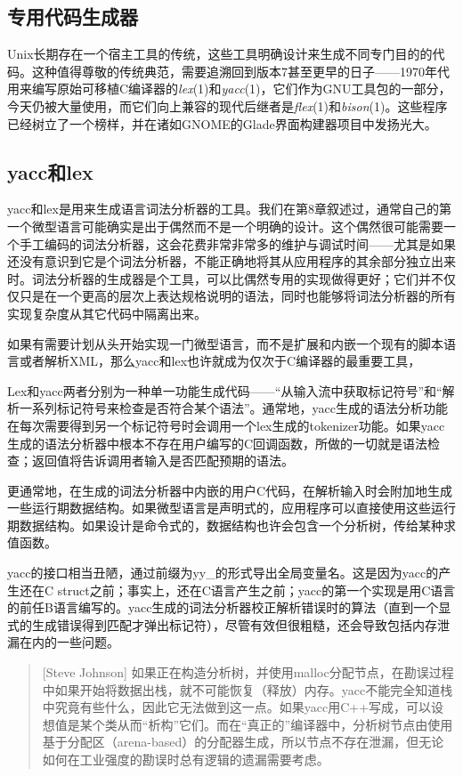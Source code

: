 \documentclass[12pt,oneside]{book}
\begin{document}
\begin{common-format}
\section{专用代码生成器}
Unix长期存在一个宿主工具的传统，这些工具明确设计来生成不同专门目的的代码。这种值得尊敬的传统典范，需要追溯回到版本7甚至更早的日子——1970年代用来编写原始可移植C编译器的\textit{lex}(1)和\textit{yacc}(1)，它们作为GNU工具包的一部分，今天仍被大量使用，而它们向上兼容的现代后继者是\textit{flex}(1)和\textit{bison}(1)。这些程序已经树立了一个榜样，并在诸如GNOME的Glade界面构建器项目中发扬光大。


\subsection{yacc和lex}
yacc和lex是用来生成语言词法分析器的工具。我们在第8章叙述过，通常自己的第一个微型语言可能确实是出于偶然而不是一个明确的设计。这个偶然很可能需要一个手工编码的词法分析器，这会花费非常非常多的维护与调试时间——尤其是如果还没有意识到它是个词法分析器，不能正确地将其从应用程序的其余部分独立出来时。词法分析器的生成器是个工具，可以比偶然专用的实现做得更好；它们并不仅仅只是在一个更高的层次上表达规格说明的语法，同时也能够将词法分析器的所有实现复杂度从其它代码中隔离出来。

如果有需要计划从头开始实现一门微型语言，而不是扩展和内嵌一个现有的脚本语言或者解析XML，那么yacc和lex也许就成为仅次于C编译器的最重要工具，

Lex和yacc两者分别为一种单一功能生成代码——“从输入流中获取标记符号”和“解析一系列标记符号来检查是否符合某个语法”。通常地，yacc生成的语法分析功能在每次需要得到另一个标记符号时会调用一个lex生成的tokenizer功能。如果yacc生成的语法分析器中根本不存在用户编写的C回调函数，所做的一切就是语法检查；返回值将告诉调用者输入是否匹配预期的语法。

更通常地，在生成的词法分析器中内嵌的用户C代码，在解析输入时会附加地生成一些运行期数据结构。如果微型语言是声明式的，应用程序可以直接使用这些运行期数据结构。如果设计是命令式的，数据结构也许会包含一个分析树，传给某种求值函数。

yacc的接口相当丑陋，通过前缀为yy\_{}的形式导出全局变量名。这是因为yacc的产生还在C struct之前；事实上，还在C语言产生之前；yacc的第一个实现是用C语言的前任B语言编写的。yacc生成的词法分析器校正解析错误时的算法（直到一个显式的生成错误得到匹配才弹出标记符），尽管有效但很粗糙，还会导致包括内存泄漏在内的一些问题。

\begin{quote}[Steve Johnson]
如果正在构造分析树，并使用malloc分配节点，在勘误过程中如果开始将数据出栈，就不可能恢复（释放）内存。yacc不能完全知道栈中究竟有些什么，因此它无法做到这一点。如果yacc用C++写成，可以设想值是某个类从而“析构”它们。而在“真正的”编译器中，分析树节点由使用基于分配区（arena-based）的分配器生成，所以节点不存在泄漏，但无论如何在工业强度的勘误时总有逻辑的遗漏需要考虑。
\end{quote}


\end{common-format}
\end{document}
